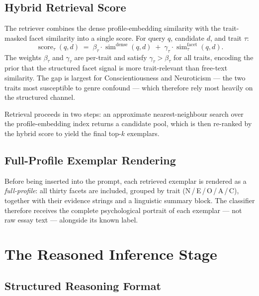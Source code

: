\documentclass[../main.tex]{subfiles}
\begin{document}
\subsection{Hybrid Retrieval Score}
\label{subsec:hybrid-score}

The retriever combines the dense profile-embedding similarity with the
trait-masked facet similarity into a single score. For query $q$, candidate
$d$, and trait $\tau$:
%
\begin{equation}
  \label{eq:hybrid}
  \operatorname{score}_\tau(q, d)
  \;=\;
  \beta_\tau \cdot \operatorname{sim}^{\mathrm{dense}}(q, d)
  \;+\;
  \gamma_\tau \cdot \operatorname{sim}^{\mathrm{facet}}_{\tau}(q, d).
\end{equation}
%
The weights $\beta_\tau$ and $\gamma_\tau$ are per-trait and satisfy
$\gamma_\tau > \beta_\tau$ for all traits, encoding the prior that the
structured facet signal is more trait-relevant than free-text similarity.
The gap is largest for Conscientiousness and Neuroticism --- the two traits
most susceptible to genre confound --- which therefore rely most heavily on
the structured channel.

Retrieval proceeds in two steps: an approximate nearest-neighbour search over
the profile-embedding index returns a candidate pool, which is then re-ranked
by the hybrid score to yield the final top-$k$ exemplars.

\subsection{Full-Profile Exemplar Rendering}
\label{subsec:exemplar-rendering}

Before being inserted into the prompt, each retrieved exemplar is rendered as
a \emph{full-profile}: all thirty facets are included, grouped by trait
(N\,/\,E\,/\,O\,/\,A\,/\,C), together with their evidence strings and a
linguistic summary block. The classifier therefore receives the complete
psychological portrait of each exemplar --- not raw essay text ---
alongside its known label.


\section{The Reasoned Inference Stage}
\label{sec:prompt}

\subsection{Structured Reasoning Format}
\end{document}
